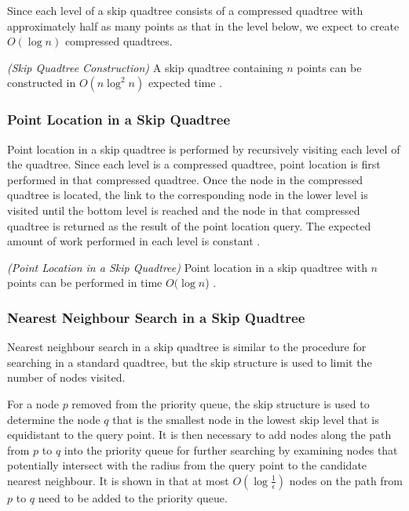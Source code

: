 \documentclass[mcs]{scsthesis}
\begin{document}
Since each level of a skip quadtree consists of a compressed quadtree with
approximately half as many points as that in the level below, we expect to
create \(O(\log n)\) compressed quadtrees.

\begin{thm} \emph{(Skip Quadtree Construction)}
A skip quadtree containing $n$ points can be constructed in \(O(n \log^2 n)\)
expected time \cite{skipquadtree}.
\end{thm}

\subsubsection{Point Location in a Skip Quadtree}

Point location in a skip quadtree is performed by recursively visiting each level
of the quadtree. Since each level is a compressed quadtree, point location is
first performed in that compressed quadtree. Once the node in the compressed
quadtree is located, the link to the corresponding node in the lower level
is visited until the bottom level is reached and the node in that compressed
quadtree is returned as the result of the point location query. The expected
amount of work performed in each level is constant \cite{skipquadtree}.

\begin{thm} \emph{(Point Location in a Skip Quadtree)} 
Point location in a skip quadtree with $n$ points can be performed in time
\(O(\log n\)) \cite{skipquadtree}. 
\end{thm}

\subsubsection{Nearest Neighbour Search in a Skip Quadtree}

Nearest neighbour search in a skip quadtree is similar to the procedure for
searching in a standard quadtree, but the skip structure is used to limit
the number of nodes visited.

For a node \(p\) removed from the priority queue, the skip structure is used to
determine the node \(q\) that is the smallest node in the lowest skip level
that is equidistant to the query point. It is then necessary to add nodes along
the path from \(p\) to \(q\) into the priority queue for further searching by
examining nodes that potentially intersect with the radius from the query point
to the candidate nearest neighbour. It is shown in \cite{skipquadtree}
that at most \(O(\log \frac{1}{\epsilon})\) nodes on the path from \(p\) to \(q\)
need to be added to the priority queue.
\end{document}
